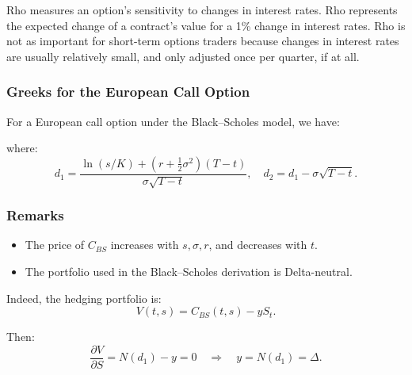 \documentclass[12pt,a4paper]{article}
\theoremstyle{definition}
\begin{document}
Rho measures an option's sensitivity to changes in interest rates. Rho represents the expected change of a contract's value for a 1\% change in interest rates. Rho is not as important for short-term options traders because changes in interest rates are usually relatively small, and only adjusted once per quarter, if at all.

\subsubsection{Greeks for the European Call Option}

For a European call option under the Black–Scholes model, we have:

\begin{center}
\end{center}

where:
\[
d_1 = \frac{\ln(s/K) + (r + \frac{1}{2}\sigma^2)(T-t)}{\sigma\sqrt{T-t}}, \quad d_2 = d_1 - \sigma\sqrt{T-t}.
\]

\subsubsection{Remarks}

\begin{itemize}
\item The price of $C_{BS}$ increases with $s, \sigma, r$, and decreases with $t$.
\item The portfolio used in the Black–Scholes derivation is Delta-neutral.
\end{itemize}

Indeed, the hedging portfolio is:
\[
V(t,s) = C_{BS}(t,s) - yS_t.
\]

Then:
\[
\frac{\partial V}{\partial S} = N(d_1) - y = 0 \quad \Longrightarrow \quad y = N(d_1) = \Delta.
\]
\end{document}
